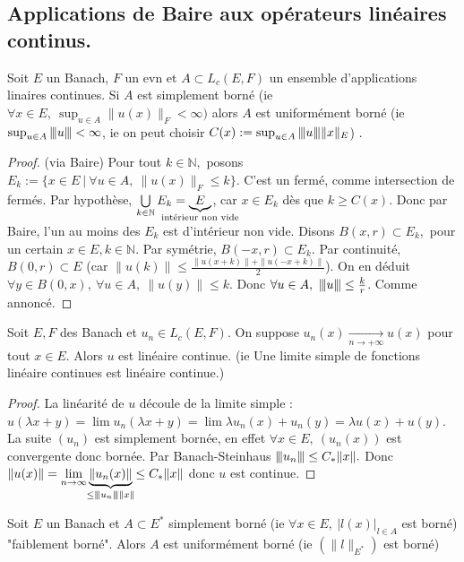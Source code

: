 \subsection{Applications de Baire aux opérateurs linéaires continus.}
\begin{theoreme}
    Soit $E$ un Banach, $F$ un evn et $A\subset L_c(E,F)$ un ensemble d'applications linaires continues. Si $A$ est simplement borné (ie $\forall x\in E,\ \sup_{u\in A}\|u(x)\|_F<\infty ) $ alors $A$ est uniformément borné (ie $\sup_{u\in A}{\left\vert\kern-0.25ex\left\vert\kern-0.25ex\left\vert u \right\vert\kern-0.25ex\right\vert\kern-0.25ex\right\vert}<\infty $, ie on peut choisir $C(x):=\sup_{u\in A}{\left\vert\kern-0.25ex\left\vert\kern-0.25ex\left\vert u \right\vert\kern-0.25ex\right\vert\kern-0.25ex\right\vert}\|x\|_E$) .
\end{theoreme}
\begin{proof}
    (via Baire) Pour tout $k\in \mathbb{N} ,$ posons $E_k:=\{x\in E\ |\ \forall u\in A,\ \|u(x)\|_F\le k \} $. C'est un fermé, comme intersection de fermés.
    Par hypothèse, $\bigcup\limits_{k\in \mathbb{N} } E_k=\underbrace{E}_{\mathclap{\text{intérieur non vide}}}$, car $x\in E_k$ dès que $k\ge C(x)$.
    Donc par Baire, l'un au moins des $E_k$ est d'intérieur non vide. 
    Disons $B(x,r)\subset E_k,$ pour un certain $x\in E,k\in \mathbb{N}$. 
    Par symétrie, $B(-x,r)\subset E_k$. 
    Par continuité, $B(0,r)\subset E$ (car $\|u(k)\|\le \frac{\|u(x+k)\|+\|u(-x+k)\|}{2}$). 
    On en déduit $\forall y\in B(0,x),\ \forall u\in A,\ \|u(y)\|\le k$.
    Donc $\forall u\in A,\ {\left\vert\kern-0.25ex\left\vert\kern-0.25ex\left\vert u \right\vert\kern-0.25ex\right\vert\kern-0.25ex\right\vert}\le \frac{k}{r}$.
    Comme annoncé.
\end{proof}
\begin{corollaire}
    Soit $E,F$ des Banach et $u_n\in L_c(E,F).$ On suppose $u_n(x)\xrightarrow[n\to +\infty]{} u(x)$ pour tout $x\in E.$ Alors $u$ est linéaire continue. (ie Une limite simple de fonctions linéaire continues est linéaire continue.)
\end{corollaire}
\begin{proof}
    La linéarité de $u$ découle de la limite simple : $u(\lambda x+y)=\lim u_n(\lambda x+y)=\lim \lambda u_n(x)+u_n(y)=\lambda u(x)+u(y)$.\\
    La suite $(u_n)$ est simplement bornée, en effet $\forall x\in E,\ (u_n(x)) $ est convergente donc bornée. Par Banach-Steinhaus ${\left\vert\kern-0.25ex\left\vert\kern-0.25ex\left\vert u_n \right\vert\kern-0.25ex\right\vert\kern-0.25ex\right\vert}\le C_*\|x\|.$ Donc $\|u(x)\|=\lim_{n\to \infty }\underbrace{\|u_n(x)\|}_{\mathclap{\substack{\le \vertiii{u_n}\|x\|}}}\le C_*\|x\|$ donc $u$ est continue.
\end{proof}
\begin{corollaire}
    Soit $E$ un Banach et $A\subset E^*$ simplement borné (ie $\forall x\in E,\ |l(x)|_{l\in A} $ est borné) "faiblement borné". Alors $A$ est uniformément borné (ie $(\|l\|_{E^*})$ est borné)
\end{corollaire}

